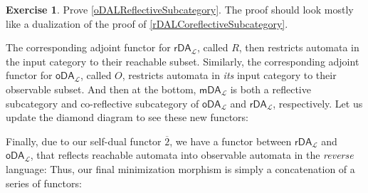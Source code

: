 \documentclass{article}
\theoremstyle{plain}
\theoremstyle{definition}
\newtheorem{exercise}{Exercise}
\begin{document}
\begin{exercise}
Prove \ref{oDALReflectiveSubcategory}. The proof should look mostly like a dualization of the proof of \ref{rDALCoreflectiveSubcategory}.
\end{exercise}


The corresponding adjoint functor for \ensuremath{{\mathsf{rDA}}_{\mathcal{L}}}, called \ensuremath{R}, then restricts automata in the input category to their reachable subset. Similarly, the corresponding adjoint functor for \ensuremath{{\mathsf{oDA}}_{\mathcal{L}}}, called \ensuremath{O}, restricts automata in \emph{its} input category to their observable subset. And then at the bottom, \ensuremath{{\mathsf{mDA}}_{\mathcal{L}}} is both a reflective subcategory and co-reflective subcategory of \ensuremath{{\mathsf{oDA}}_{\mathcal{L}}} and \ensuremath{{\mathsf{rDA}}_{\mathcal{L}}}, respectively. Let us update the diamond diagram to see these new functors:


\begin{center}
\end{center}


Finally, due to our self-dual functor \ensuremath{\overline{2}}, we have a functor between \ensuremath{{\mathsf{rDA}}_{\mathcal{L}}} and \ensuremath{{\mathsf{oDA}}_{\mathcal{L}}}, that reflects reachable automata into observable automata in the \emph{reverse} language: Thus, our final minimization morphism is simply a concatenation of a series of functors:
\end{document}
